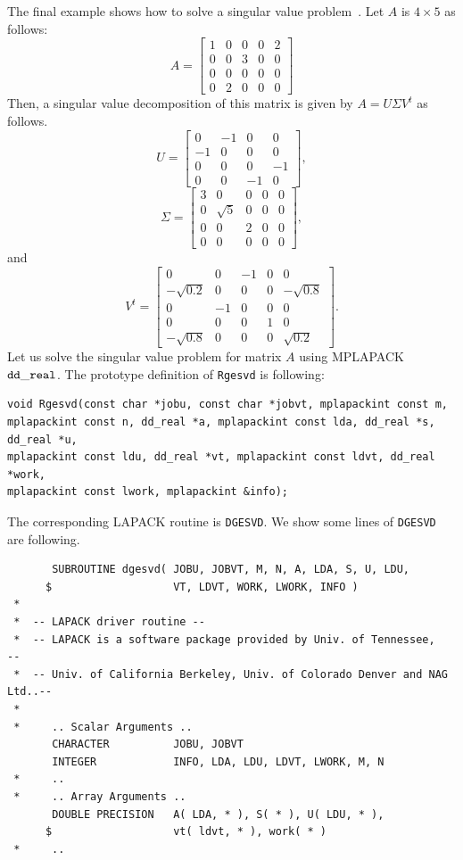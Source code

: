 \documentclass[12pt]{article}
\begin{document}
The final example shows how to solve a singular value problem~\cite{wikipedia_svd}.
Let $A$ is $4 \times 5$ as follows:
\[
A=\left[\begin{array}{lllll}1 & 0 & 0 & 0 & 2 \\ 0 & 0 & 3 & 0 & 0 \\ 0 & 0 & 0 & 0 & 0 \\ 0 & 2 & 0 & 0 & 0\end{array}\right]
\]
Then, a singular value decomposition of this matrix is given by $A= U\Sigma V^t$ as follows.
\[
{U}=\left[\begin{array}{cccc}0 & -1 & 0 & 0 \\ -1 & 0 & 0 & 0 \\ 0 & 0 & 0 & -1 \\ 0 & 0 & -1 & 0\end{array}\right],
\]
\[
\Sigma=\left[\begin{array}{ccccc}3 & 0 & 0 & 0 & 0 \\ 0 & \sqrt{5} & 0 & 0 & 0 \\ 0 & 0 & 2 & 0 & 0 \\ 0 & 0 & 0 & 0 & 0\end{array}\right],
\]
and
\[
V^t=\left[\begin{array}{ccccc}0 & 0 & -1 & 0 & 0 \\ -\sqrt{0.2} & 0 & 0 & 0 & -\sqrt{0.8} \\ 0 & -1 & 0 & 0 & 0 \\ 0 & 0 & 0 & 1 & 0 \\ -\sqrt{0.8} & 0 & 0 & 0 & \sqrt{0.2}\end{array}\right].
\]
Let us solve the singular value problem for matrix $A$ using MPLAPACK $\tt dd\_real$.
The prototype definition of {\tt Rgesvd} is following:
\begin{verbatim}
void Rgesvd(const char *jobu, const char *jobvt, mplapackint const m, 
mplapackint const n, dd_real *a, mplapackint const lda, dd_real *s, dd_real *u, 
mplapackint const ldu, dd_real *vt, mplapackint const ldvt, dd_real *work, 
mplapackint const lwork, mplapackint &info);
\end{verbatim}
The corresponding LAPACK routine is {\tt DGESVD}. We show some lines of {\tt DGESVD} are following. 
\begin{verbatim}
       SUBROUTINE dgesvd( JOBU, JOBVT, M, N, A, LDA, S, U, LDU,
      $                   VT, LDVT, WORK, LWORK, INFO )
 *
 *  -- LAPACK driver routine --
 *  -- LAPACK is a software package provided by Univ. of Tennessee,    --
 *  -- Univ. of California Berkeley, Univ. of Colorado Denver and NAG Ltd..--
 *
 *     .. Scalar Arguments ..
       CHARACTER          JOBU, JOBVT
       INTEGER            INFO, LDA, LDU, LDVT, LWORK, M, N
 *     ..
 *     .. Array Arguments ..
       DOUBLE PRECISION   A( LDA, * ), S( * ), U( LDU, * ),
      $                   vt( ldvt, * ), work( * )
 *     ..
\end{verbatim}
\end{document}
